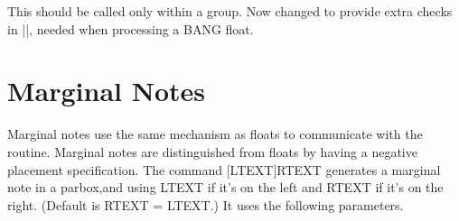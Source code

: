   \begin{macro}{\@dblfloatplacement}
 
     This should be called only within a group.  Now changed to
     provide extra checks in |\@addtodblcol|, needed when processing a
     BANG float.
    
    \begin{teX}  
\def \@dblfloatplacement {%
    \end{teX}
    Textpage bit: global, but need not be.
    \begin{teX}  
  \global \@dbltopnum \c@dbltopnumber
  \global \@dbltoproom \dbltopfraction\@colht
    \end{teX}
   This new bit uses |\@textmin| to locally store the amount of extra
   room in the column.   
    \begin{teX}
  \@textmin \@colht
  \advance \@textmin -\@dbltoproom
    \end{teX}
    Floatpage bit: must be local.
    \begin{teX}
  \@fpmin \dblfloatpagefraction\textheight
  \@fptop \@dblfptop
  \@fpsep \@dblfpsep
  \@fpbot \@dblfpbot
}
    \end{teX}
  \end{macro}


\section{Marginal Notes}

   Marginal notes use the same mechanism as floats to communicate
   with the  routine.  Marginal notes are distinguished from
   floats by having a negative placement specification.  The command
   [LTEXT]{RTEXT} generates a marginal note in a parbox,\marginpar[left] and 
   using LTEXT if it's on the left and RTEXT if it's on the right.
   (Default is RTEXT = LTEXT.)  It uses the following parameters.




